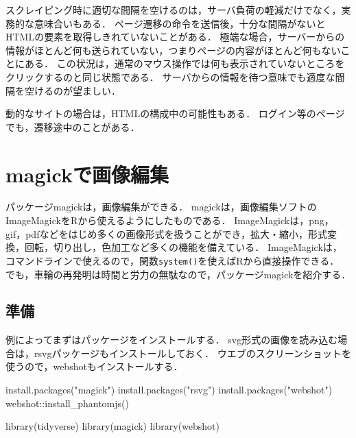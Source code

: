 \documentclass[
]{article}
\newenvironment{Shaded}{\begin{snugshade}}{\end{snugshade}}
\newcommand{\FunctionTok}[1]{\textcolor[rgb]{0.00,0.00,0.00}{#1}}
\newcommand{\NormalTok}[1]{#1}
\newcommand{\SpecialCharTok}[1]{\textcolor[rgb]{0.00,0.00,0.00}{#1}}
\newcommand{\StringTok}[1]{\textcolor[rgb]{0.31,0.60,0.02}{#1}}
\begin{document}
スクレイピング時に適切な間隔を空けるのは，サーバ負荷の軽減だけでなく，実務的な意味合いもある．
ページ遷移の命令を送信後，十分な間隔がないとHTMLの要素を取得しきれていないことがある．
極端な場合，サーバーからの情報がほとんど何も送られていない，つまりページの内容がほとんど何もないことにある．
この状況は，通常のマウス操作では何も表示されていないところをクリックするのと同じ状態である．
サーバからの情報を待つ意味でも適度な間隔を空けるのが望ましい．

動的なサイトの場合は，HTMLの構成中の可能性もある．
ログイン等のページでも，遷移途中のことがある．

\hypertarget{magick}{%
\section{magickで画像編集}\label{magick}}

パッケージmagickは，画像編集ができる．
magickは，画像編集ソフトのImageMagickをRから使えるようにしたものである．
ImageMagickは，png，gif，pdfなどをはじめ多くの画像形式を扱うことができ，拡大・縮小，形式変換，回転，切り出し，色加工など多くの機能を備えている．
ImageMagickは，コマンドラインで使えるので，関数\texttt{system()}を使えばRから直接操作できる．
でも，車輪の再発明は時間と労力の無駄なので，パッケージmagickを紹介する．

\hypertarget{ux6e96ux5099-11}{%
\subsection{準備}\label{ux6e96ux5099-11}}

例によってまずはパッケージをインストールする．
svg形式の画像を読み込む場合は，rsvgパッケージもインストールしておく．
ウエブのスクリーンショットを使うので，webshotもインストールする．

\begin{Shaded}
\begin{Highlighting}[]
\FunctionTok{install.packages}\NormalTok{(}\StringTok{"magick"}\NormalTok{)}
\FunctionTok{install.packages}\NormalTok{(}\StringTok{"rsvg"}\NormalTok{)}
\FunctionTok{install.packages}\NormalTok{(}\StringTok{"webshot"}\NormalTok{)}
\NormalTok{webshot}\SpecialCharTok{::}\FunctionTok{install\_phantomjs}\NormalTok{()}
\end{Highlighting}
\end{Shaded}

\begin{Shaded}
\begin{Highlighting}[]
\FunctionTok{library}\NormalTok{(tidyverse)}
\FunctionTok{library}\NormalTok{(magick)}
\FunctionTok{library}\NormalTok{(webshot)}
\end{Highlighting}
\end{Shaded}
\end{document}
